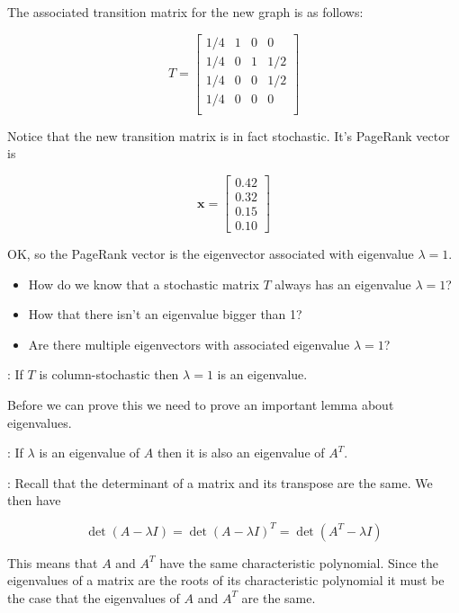 \documentclass[12pt]{article}
\newcommand{\nin}{\noindent}
\newcommand{\vthree}{\vspace{3mm}}
\newcommand{\myp}[1]{\left( #1 \right)}
\newcommand{\mymat}[1]{
\left[
\begin{array}{rrrrrrrrrrrrrrrrrrrrrrrrrrrrrrrrrrrrrrr}
#1
\end{array}
\right]
}
\newcommand{\bx}{\mathbf{x}}
\begin{document}
\vthree

\nin The associated transition matrix for the new graph is as follows:

\[
T =
\mymat{
1/4 & 1 & 0 & 0 \\
1/4 & 0 & 1 & 1/2 \\
1/4 & 0 & 0 & 1/2 \\
1/4 & 0 & 0 & 0 \\
}
\]

\vthree

\nin Notice that the new transition matrix is in fact stochastic.  It's PageRank vector is

\[
\bx = \mymat{
0.42 \\
0.32 \\
0.15 \\
0.10
}
\]

\clearpage

\nin OK, so the PageRank vector is the eigenvector associated with eigenvalue $\lambda = 1$.

\vthree

\begin{itemize}
\item How do we know that a stochastic matrix $T$ always has an eigenvalue $\lambda = 1$?
\item How that there isn't an eigenvalue bigger than 1?
\item Are there multiple eigenvectors with associated eigenvalue $\lambda = 1$?
\end{itemize}

\vthree

\nin {\bf Fact 5}: If $T$ is column-stochastic then $\lambda = 1$ is an eigenvalue.

\vthree

\nin Before we can prove this we need to prove an important lemma about eigenvalues.

\vthree

\nin {\bf Lemma}: If $\lambda$ is an eigenvalue of $A$ then it is also an eigenvalue of $A^T$.

\vthree

\nin {\bf Proof}: Recall that the determinant of a matrix and its transpose are the same.  We then have

\[
\det\myp{A - \lambda I} = \det\myp{A - \lambda I}^T = \det\myp{A^T - \lambda I}
\]

\vthree

\nin This means that $A$ and $A^T$ have the same characteristic polynomial.  Since the eigenvalues of a matrix are the roots of its characteristic polynomial it must be the case that the eigenvalues of $A$ and $A^T$ are the same.
\end{document}
